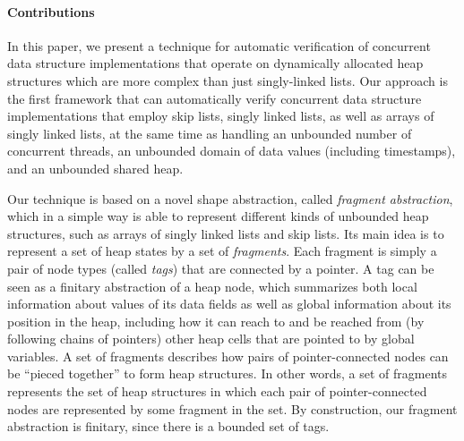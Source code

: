 
\paragraph{Contributions}
In this paper, we present a technique for automatic verification of concurrent
data structure implementations that operate on dynamically allocated
heap structures which are more complex than just singly-linked lists.
Our approach is the first framework that
can automatically verify concurrent data structure implementations that employ
skip lists, singly linked lists, as well as arrays of singly linked lists,
at the same time as handling an unbounded
number of concurrent threads, an unbounded domain of data values
(including timestamps), and an unbounded shared heap.

Our technique is based on a novel shape abstraction,
called {\em fragment abstraction}, which in a simple way is able to represent
different kinds of unbounded heap structures, such as arrays of singly linked
lists and skip lists.
Its main idea is to represent a set of heap states by a set of {\em fragments}.
Each fragment is simply a pair of node types (called {\em tags}) that are
connected by a pointer. A tag can be seen as a finitary abstraction of
a heap node, which summarizes both local information about
values of its data fields
as well as global information about its position in the heap, including how
it can reach to and be reached from (by following chains of pointers)
other heap cells that are pointed to by global variables.
A set of fragments describes how pairs of pointer-connected nodes can be
``pieced together'' to form heap structures. 
In other words, a set of fragments represents the set of heap structures in
which each pair of pointer-connected nodes are represented by some
fragment in the set.
By construction, our fragment abstraction is finitary, since there is
a bounded set of tags.

